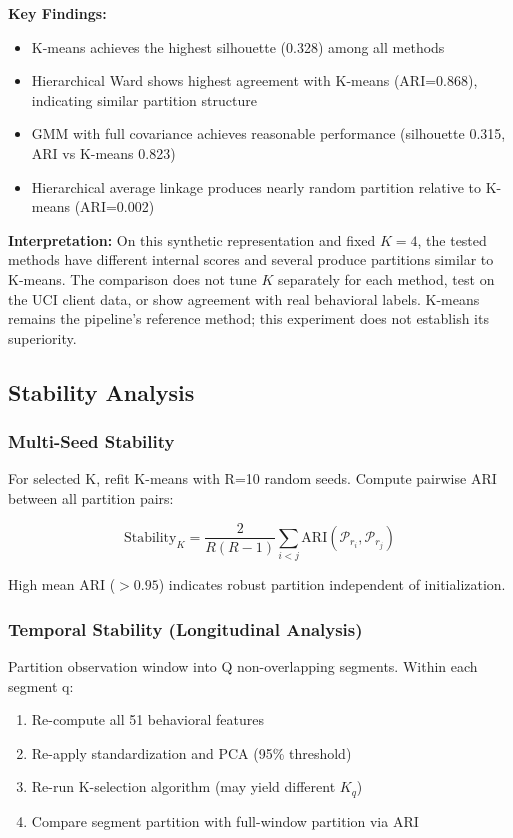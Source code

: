 \documentclass[11pt,a4paper]{article}
\begin{document}
\textbf{Key Findings:}
\begin{itemize}
    \item K-means achieves the highest silhouette (0.328) among all methods
    \item Hierarchical Ward shows highest agreement with K-means (ARI=0.868), indicating similar partition structure
    \item GMM with full covariance achieves reasonable performance (silhouette 0.315, ARI vs K-means 0.823)
    \item Hierarchical average linkage produces nearly random partition relative to K-means (ARI=0.002)
\end{itemize}

\textbf{Interpretation:} On this synthetic representation and fixed $K=4$, the tested methods have different internal scores and several produce partitions similar to K-means. The comparison does not tune $K$ separately for each method, test on the UCI client data, or show agreement with real behavioral labels. K-means remains the pipeline's reference method; this experiment does not establish its superiority.

\subsection{Stability Analysis}
\label{sec:stability}

\subsubsection{Multi-Seed Stability}

For selected K, refit K-means with R=10 random seeds. Compute pairwise ARI between all partition pairs:

\begin{equation}
\text{Stability}_K = \frac{2}{R(R-1)} \sum_{i < j} \text{ARI}(\mathcal{P}_{r_i}, \mathcal{P}_{r_j})
\end{equation}

High mean ARI ($> 0.95$) indicates robust partition independent of initialization.

\subsubsection{Temporal Stability (Longitudinal Analysis)}

Partition observation window into Q non-overlapping segments. Within each segment q:
\begin{enumerate}
    \item Re-compute all 51 behavioral features
    \item Re-apply standardization and PCA (95\% threshold)
    \item Re-run K-selection algorithm (may yield different $K_q$)
    \item Compare segment partition with full-window partition via ARI
\end{enumerate}
\end{document}
